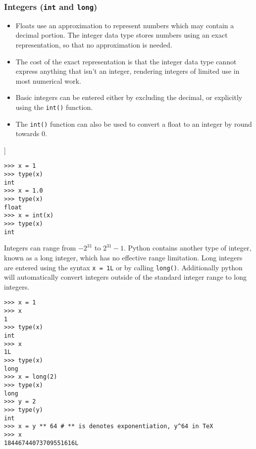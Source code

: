 \documentclass[Pydata.tex]{subfiles}
\begin{document}
\subsubsection{Integers (\texttt{int} and \texttt{long})}
\begin{itemize}
\item Floats use an approximation to represent numbers which may contain a decimal portion. The integer data
type stores numbers using an exact representation, so that no approximation is needed. \item The cost of the
exact representation is that the integer data type cannot express anything that isn’t an integer, rendering
integers of limited use in most numerical work.
\item Basic integers can be entered either by excluding the decimal, or explicitly using the \texttt{int()}
function. 

\item The \texttt{int()} function can also be used to convert a float to an integer by round towards 0.
\end{itemize}]
\begin{framed}
\begin{verbatim}
>>> x = 1
>>> type(x)
int
>>> x = 1.0
>>> type(x)
float
>>> x = int(x)
>>> type(x)
int
\end{verbatim}
\end{framed}
\noindent Integers can range from $-2^{31}$ to $2^{31}-1$. 
Python contains another type of integer, known as a long
integer, which has no effective range limitation. Long integers are entered using the syntax \texttt{x = 1L} or by
calling \texttt{long()}. Additionally python will automatically convert integers outside of the standard integer
range to long integers.
\begin{framed}
\begin{verbatim}
>>> x = 1
>>> x
1
>>> type(x)
int
>>> x
1L
>>> type(x)
long
>>> x = long(2)
>>> type(x)
long
>>> y = 2
>>> type(y)
int
>>> x = y ** 64 # ** is denotes exponentiation, y^64 in TeX
>>> x
18446744073709551616L
\end{verbatim}
\end{framed}
\newpage
\end{document}
